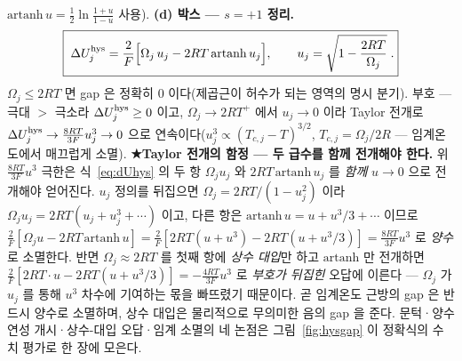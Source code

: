 $\mathrm{artanh}\,u=\tfrac12\ln\tfrac{1+u}{1-u}$ 사용). \textbf{(d) 박스 --- $s=+1$ 정리.}
\begin{equation}
\boxed{\;\Delta U_j^{\mathrm{hys}}
=\frac{2}{F}\Big[\Omega_j\,u_j-2RT\,\mathrm{artanh}\,u_j\Big],
\qquad u_j=\sqrt{1-\frac{2RT}{\Omega_j}}\;.}
\label{eq:dUhys}
\end{equation}
$\Omega_j\le2RT$ 면 gap 은
정확히 $0$ 이다(제곱근이 허수가 되는 영역의 명시 분기). 부호 --- 극대 $>$ 극소라 $\Delta U_j^{\mathrm{hys}}\ge0$ 이고, $\Omega_j\to2RT^+$ 에서
$u_j\to0$ 이라 Taylor 전개로 $\Delta U_j^{\mathrm{hys}}\to\frac{8RT}{3F}u_j^3\to0$ 으로
연속이다($u_j^3\propto(T_{c,j}-T)^{3/2}$, $T_{c,j}=\Omega_j/2R$ --- 임계온도에서 매끄럽게 소멸). \textbf{★Taylor 전개의 함정
--- 두 급수를 함께 전개해야 한다.} 위 $\frac{8RT}{3F}u^3$ 극한은 식~\eqref{eq:dUhys} 의 두 항 $\Omega_ju_j$ 와
$2RT\,\mathrm{artanh}\,u_j$ 를 \emph{함께} $u\to0$ 으로 전개해야 얻어진다. $u_j$ 정의를 뒤집으면
$\Omega_j=2RT/(1-u_j^2)$ 이라 $\Omega_ju_j=2RT(u_j+u_j^3+\cdots)$ 이고, 다른 항은 $\mathrm{artanh}\,u=u+u^3/3+\cdots$ 이므로
$\frac{2}{F}[\Omega_ju-2RT\,\mathrm{artanh}\,u]=\frac{2}{F}[2RT(u+u^3)-2RT(u+u^3/3)]=\frac{8RT}{3F}u^3$ 로 \emph{양수}로 소멸한다.
반면 $\Omega_j\approx2RT$ 를 첫째 항에 \emph{상수 대입}만 하고 $\mathrm{artanh}$ 만 전개하면
$\frac{2}{F}[2RT\cdot u-2RT(u+u^3/3)]=-\frac{4RT}{3F}u^3$ 로 \emph{부호가 뒤집힌} 오답에 이른다 --- $\Omega_j$ 가
$u_j$ 를 통해 $u^3$ 차수에 기여하는 몫을 빠뜨렸기 때문이다. 곧 임계온도 근방의 gap 은 반드시 양수로 소멸하며,
상수 대입은 물리적으로 무의미한 음의 gap 을 준다. 문턱·양수 연성 개시·상수-대입 오답·임계 소멸의 네 논점은
그림~\ref{fig:hysgap} 이 정확식의 수치 평가로 한 장에 모은다.

